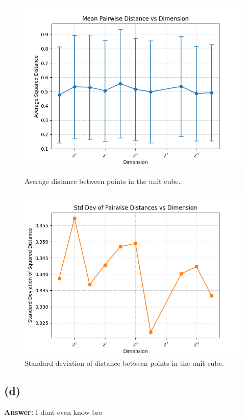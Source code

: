 \documentclass{article}
\begin{document}
\begin{figure}[h!]
    \centering
    \begin{minipage}[b]{0.4\textwidth}
        \centering
        \includegraphics[width=\linewidth]{images/Figure_1_1c.png}
        \caption{Average distance between points in the unit cube.}
        \label{fig:average_distance}
    \end{minipage}
    \hspace{0.05\textwidth} %
    \begin{minipage}[b]{0.4\textwidth}
        \centering
        \includegraphics[width=\linewidth]{images/Figure_2_1c.png}
        \caption{Standard deviation of distance between points in the unit cube.}
        \label{fig:std_distance}
    \end{minipage}
\end{figure}

\color{black}
\subsection*{(d)}
\color{answer}
\textbf{Answer:}
I dont even know bro \\
\color{black}
\end{document}
